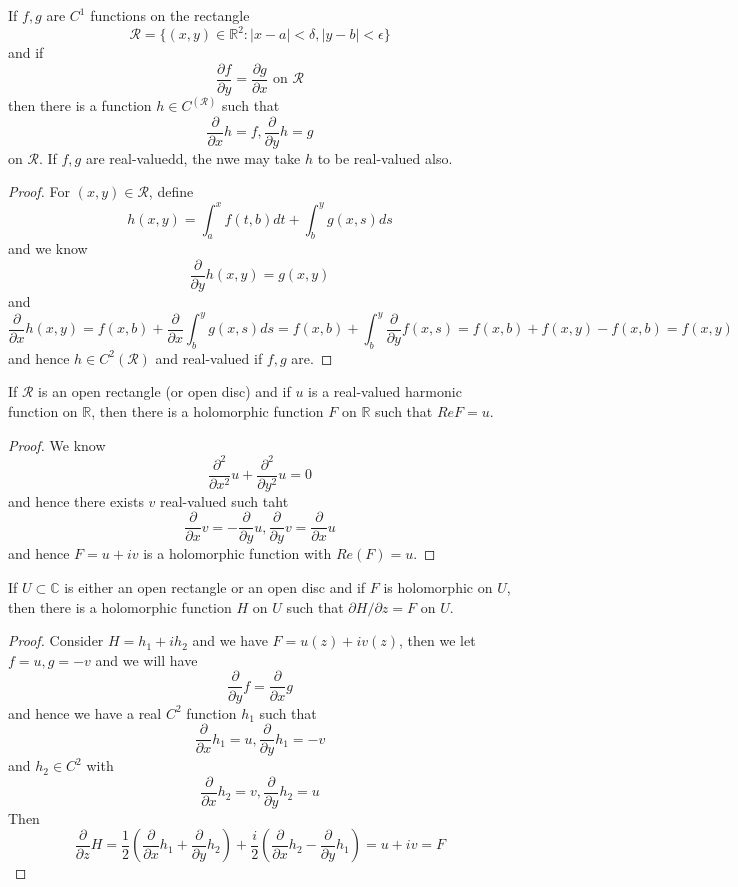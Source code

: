 \documentclass[lang=en, color=blue, ]{elegantbook}
\newcommand{\R}{\mathbb{R}}
\newcommand{\C}{\mathbb{C}}
\newcommand{\ParZ}{\dfrac{\partial}{\partial z}}
\newcommand{\ParX}{\dfrac{\partial}{\partial x}}
\newcommand{\ParY}{\dfrac{\partial}{\partial y}}
\begin{document}
\begin{theorem}
    If $f,g$ are $C^1$ functions on the rectangle
    \[\mathcal{R} = \{(x,y)\in \R^2: |x-a|<\delta, |y-b|<\epsilon\}\]
    and if 
    \[
    \dfrac{\partial f}{\partial y} = \dfrac{\partial g}{\partial x}\text{ on }\mathcal{R}
    \]
    then there is a function $h\in C^(\mathcal{R})$ such that
    \[\ParX h =f, \ParY h = g\]
    on $\mathcal{R}$. If $f,g$ are real-valuedd, the nwe may take $h$ to be real-valued also.
\end{theorem}
\begin{proof}\par
    For $(x,y) \in \mathcal{R}$, define
    \[h(x,y) = \int_a^x f(t,b) dt + \int_b^y g(x,s)ds\]
    and we know
    \[
    \ParY h(x,y) = g(x,y)
    \]
    and 
    \[\ParX h(x,y) = f(x,b) + \ParX \int_b^y g(x,s) ds = f(x,b) + \int_b^y \ParY f(x,s) = f(x,b) + f(x,y)-f(x,b) = f(x,y)\]
    and hence $h \in C^2(\mathcal{R})$ and real-valued if $f,g$ are.
\end{proof}

\begin{corollary}
    If $\mathcal{R}$ is an open rectangle (or open disc) and if $u$ is a real-valued harmonic function on $\R$, then there is a holomorphic function $F$ on $\R$ such that $Re F = u$.
\end{corollary}
\begin{proof}\par
    We know 
    \[\dfrac{\partial^2}{\partial x^2} u + \dfrac{\partial^2}{\partial y^2} u =0\]
    and hence there exists $v$ real-valued such taht
    \[\ParX v = - \ParY u, \ParY v = \ParX u\]
    and hence $F = u+iv$ is a holomorphic function with $Re(F) = u$.
\end{proof}

\begin{theorem}
    If $U\subset \C$ is either an open rectangle or an open disc and if $F$ is holomorphic on $U$, then there is a holomorphic function $H$ on $U$ such that $\partial H/\partial z = F$ on $U$. 
\end{theorem}
\begin{proof}\par
    Consider $H = h_1 + ih_2$ and 
    we have $F = u(z) + iv(z)$, then we let $f= u ,g = -v$ and we will have
    \[\ParY f = \ParX g\]
    and hence we have a real $C^2$ function $h_1$ such that
    \[\ParX h_1 = u, \ParY h_1 = -v\]
    and $h_2 \in C^2$ with
    \[\ParX h_2 = v, \ParY h_2 = u\]
    Then
    \[\ParZ H = \dfrac{1}{2}(\ParX h_1 + \ParY h_2)+\dfrac{i}{2}(\ParX h_2 - \ParY h_1) = u+iv = F\]
\end{proof}
\end{document}
